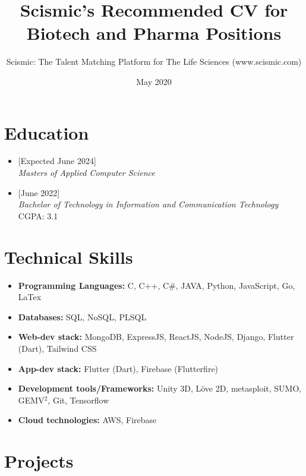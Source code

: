 \documentclass{article}
\title{Scismic's Recommended CV for Biotech and Pharma Positions}
\author{Scismic: The Talent Matching Platform for The Life Sciences (www.scismic.com)}
\date{May 2020}
\begin{document}

\makecvtitle %

\section{Education}
\begin{itemize}

\item
{}[Expected June 2024]
\\\textit{Masters of Applied Computer Science}
\item
{}[June 2022]
\\\textit{Bachelor of Technology in Information and Communication Technology}
\\
CGPA: 3.1

\end{itemize}
 
\section{Technical Skills}

\begin{itemize}
\item \textbf{Programming Languages:} C, C++, C\#, JAVA, Python, JavaScript, Go, LaTex
\item \textbf{Databases:} SQL, NoSQL, PLSQL
\item \textbf{Web-dev stack:} MongoDB, ExpressJS, ReactJS, NodeJS, Django, Flutter (Dart), Tailwind CSS
\item \textbf{App-dev stack:} Flutter (Dart), Firebase (Flutterfire)
\item \textbf{Development tools/Frameworks:} Unity 3D, Löve 2D, metasploit, SUMO, GEMV$^2$, Git, Tensorflow
\item \textbf{Cloud technologies:} AWS, Firebase

\end{itemize}
 
\section{Projects}
\end{document}
